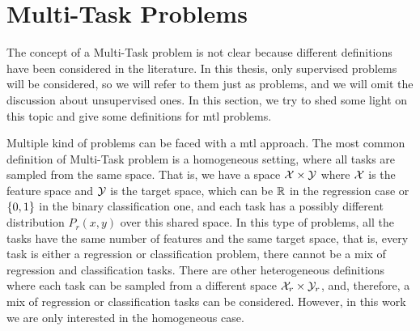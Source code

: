 \section{Multi-Task Problems}
The concept of a Multi-Task problem is not clear because different definitions have been considered in the literature. 
In this thesis, only supervised problems will be considered, so we will refer to them just as problems, and we will omit the discussion about unsupervised ones. In this section, we try to shed some light on this topic and give some definitions for \acrshort{mtl} problems.

Multiple kind of problems can be faced with a \acrshort{mtl} approach. 
%
The most common definition of Multi-Task problem is a homogeneous setting, where all tasks are sampled from the same space. That is, we have a space $\mathcal{X} \times \mathcal{Y}$ where $\mathcal{X}$ is the feature space and $\mathcal{Y}$ is the target space, which can be $\mathbb{R}$ in the regression case or $\left\{0, 1\right\}$ in the binary classification one, and each task has a possibly different distribution $P_r(x, y)$ over this shared space.
In this type of problems, all the tasks have the same number of features and the same target space, that is, every task is either a regression or classification problem, there cannot be a mix of regression and classification tasks.
%
There are other heterogeneous definitions where each task can be sampled from a different space $\mathcal{X}_r \times \mathcal{Y}_r$, and, therefore, a mix of regression or classification tasks can be considered. However, in this work we are only interested in the homogeneous case.
%

